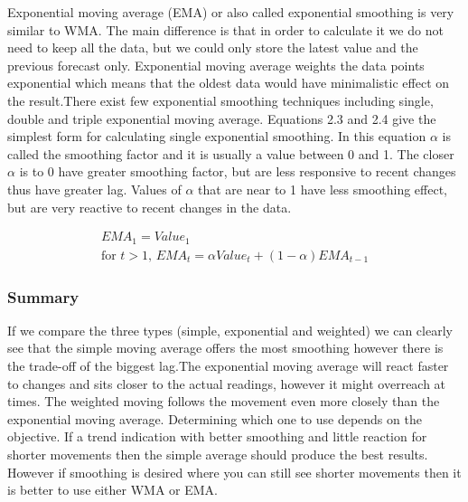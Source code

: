 Exponential moving average (EMA) or also called exponential smoothing is very similar to WMA. The main difference is that in order to calculate it we do not need to keep all the data, but we could only store the latest value and the previous forecast only. Exponential moving average weights the data points exponential which means that the oldest data would have minimalistic effect on the result.There exist few exponential smoothing techniques including single, double and triple exponential moving average. Equations 2.3 and 2.4 give the simplest form for calculating single exponential smoothing. In this equation $\alpha$ is called the smoothing factor and it is usually a value between 0 and 1. The closer $\alpha$ is to 0 have greater smoothing factor, but are less responsive to recent changes thus have greater lag. Values of $\alpha$ that are near to 1 have less smoothing effect, but are very reactive to recent changes in the data. 

\begin{align}\label{ema}
EMA_1 = Value_1 \\
\textrm{for } t > 1\textrm{, }EMA_t = \alpha Value_t + (1-\alpha) EMA_{t-1}
\end{align}

\subsubsection{Summary}
If we compare the three types (simple, exponential and weighted) we can clearly see that the simple moving average offers the most smoothing however there is the trade-off of the biggest lag.The exponential moving average will react faster to changes and sits closer to the actual readings, however it might overreach at times. The weighted moving follows the movement even more closely than the exponential moving average. Determining which one to use depends on the objective. If a trend indication with better smoothing and little reaction for shorter movements then the simple average should produce the best results. However if smoothing is desired where you can still see shorter movements then it is better to use either WMA or EMA.

